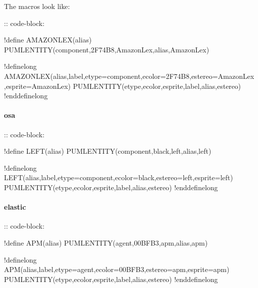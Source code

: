 \documentclass[letterpaper,10pt,english]{sphinxmanual}
\begin{document}
The macros look like:

:: code-block:

\begin{sphinxVerbatim}[commandchars=\\\{\}]
!define AMAZONLEX(alias) PUML\PYGZus{}ENTITY(component,\PYGZsh{}2F74B8,AmazonLex,alias,AmazonLex)

!definelong AMAZONLEX(alias,label,e\PYGZus{}type=\PYGZdq{}component\PYGZdq{},e\PYGZus{}color=\PYGZdq{}\PYGZsh{}2F74B8\PYGZdq{},e\PYGZus{}stereo=\PYGZdq{}AmazonLex\PYGZdq{},e\PYGZus{}sprite=\PYGZdq{}AmazonLex\PYGZdq{})
PUML\PYGZus{}ENTITY(e\PYGZus{}type,e\PYGZus{}color,e\PYGZus{}sprite,label,alias,e\PYGZus{}stereo)
!enddefinelong
\end{sphinxVerbatim}


\paragraph{osa}
\label{\detokenize{Stdlib/StdLibOverview:osa}}

:: code-block:

\begin{sphinxVerbatim}[commandchars=\\\{\}]
!define LEFT(alias) PUML\PYGZus{}ENTITY(component,black,left,alias,left)

!definelong LEFT(alias,label,e\PYGZus{}type=\PYGZdq{}component\PYGZdq{},e\PYGZus{}color=\PYGZdq{}black\PYGZdq{},e\PYGZus{}stereo=\PYGZdq{}left\PYGZdq{},e\PYGZus{}sprite=\PYGZdq{}left\PYGZdq{})
PUML\PYGZus{}ENTITY(e\PYGZus{}type,e\PYGZus{}color,e\PYGZus{}sprite,label,alias,e\PYGZus{}stereo)
!enddefinelong
\end{sphinxVerbatim}


\paragraph{elastic}
\label{\detokenize{Stdlib/StdLibOverview:elastic}}

:: code-block:

\begin{sphinxVerbatim}[commandchars=\\\{\}]
!define APM(alias) PUML\PYGZus{}ENTITY(agent,00BFB3,apm,alias,apm)

!definelong APM(alias,label,e\PYGZus{}type=\PYGZdq{}agent\PYGZdq{},e\PYGZus{}color=\PYGZdq{}00BFB3\PYGZdq{},e\PYGZus{}stereo=\PYGZdq{}apm\PYGZdq{},e\PYGZus{}sprite=\PYGZdq{}apm\PYGZdq{})
PUML\PYGZus{}ENTITY(e\PYGZus{}type,e\PYGZus{}color,e\PYGZus{}sprite,label,alias,e\PYGZus{}stereo)
!enddefinelong
\end{sphinxVerbatim}
\end{document}

